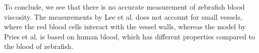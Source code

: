 \documentclass{article}
\begin{document}
To conclude, we see that there is no accurate measurement of zebrafish blood viscosity. The measurements by Lee et al. does not account for small vessels, where the red blood cells interact with the vessel walls, whereas the model by Pries et al. is based on human blood, which has different properties compared to the blood of zebrafish.

\printbibliography
\end{document}
